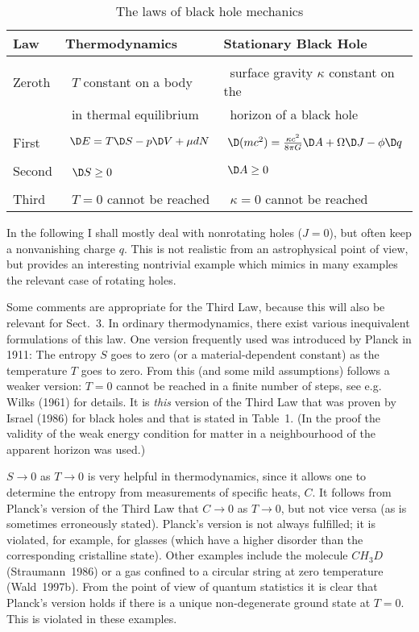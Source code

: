 \begin{table}[htb]
\caption[ ]{The laws of black hole mechanics}
\begin{flushleft}
\renewcommand{\arraystretch}{1.2}  
\begin{tabular}{l|l|l}
{Law} & {Thermodynamics} &  Stationary Black Hole\\ \hline
{} & {} & {} \\
Zeroth & \ $T$ constant on a body &\ surface gravity
                                    $\kappa$ constant on the \\
{} &\ in thermal equilibrium & \ horizon of a black hole\\
{} & {} & {} \\
First & $\ \D E=T\D S-p\D V+\mu dN$ &
 $\ \D(mc^2)=\frac{\kappa c^2}{8\pi G}\D A
+\Omega \D J-\phi \D q$ \\ 
{} & {} & {} \\
Second &\ $\D S\geq 0$ & $\ \D A\geq 0$ \\
{} & {} & {} \\
Third &\ $T=0$ cannot be reached &\ $\kappa=0$ cannot be reached\\
\end{tabular}
\renewcommand{\arraystretch}{1}
\end{flushleft}\end{table}

In the following I shall mostly deal with nonrotating holes
($J=0$), but often keep a nonvanishing charge $q$.
This is not realistic from an astrophysical point of view,
but provides an interesting nontrivial example which mimics
in many examples the relevant case of rotating holes. 

Some comments are appropriate for the Third Law, because this
will also be relevant for Sect.~3. In ordinary thermodynamics,
there exist various inequivalent formulations of this law.
One version frequently used was introduced by Planck in 1911: 
The entropy $S$ goes to zero (or a material-dependent constant) as
the temperature $T$ goes to zero. From this (and some mild
assumptions) follows a weaker version: $T=0$ cannot be reached
in a finite number of steps, see e.g. Wilks (1961) for details.
It is {\em this} version of the Third Law that was proven
by Israel (1986) for black holes and that is stated in 
Table~1. (In the proof the validity of the weak energy condition
for matter in a neighbourhood of the apparent horizon was used.)

\vskip 2mm
\small

$S\to 0$ as $T\to 0$ is very helpful in thermodynamics,
since it allows one to determine the entropy from measurements
of specific heats, $C$. It follows from Planck's version of
the Third Law that $C\to 0$ as $T\to 0$, but not vice versa
(as is sometimes erroneously stated). Planck's version is
not always fulfilled; it is violated, for example, for glasses
(which have a higher disorder than the corresponding cristalline
state). Other examples include the molecule $CH_3D$ (Straumann~1986)
or a gas confined to a circular string at zero temperature
(Wald~1997b). From the point of view of quantum statistics
it is clear that Planck's version holds if there is a unique
non-degenerate ground state at $T=0$. This is violated in these
examples.

